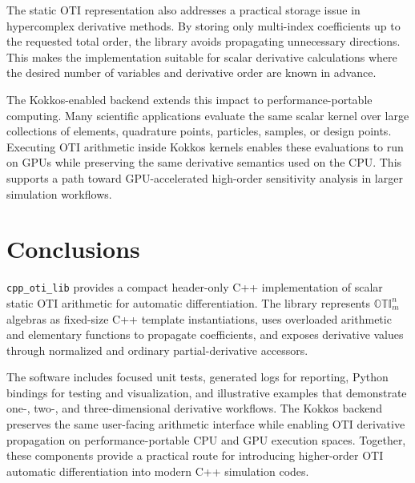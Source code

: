 \documentclass[11pt]{article}
\begin{document}
The static OTI representation also addresses a practical storage issue in
hypercomplex derivative methods. By storing only multi-index coefficients up
to the requested total order, the library avoids propagating unnecessary
directions. This makes the implementation suitable for scalar derivative
calculations where the desired number of variables and derivative order are
known in advance.

The Kokkos-enabled backend extends this impact to performance-portable
computing. Many scientific applications evaluate the same scalar kernel over
large collections of elements, quadrature points, particles, samples, or
design points. Executing OTI arithmetic inside Kokkos kernels enables these
evaluations to run on GPUs while preserving the same derivative semantics used
on the CPU. This supports a path toward GPU-accelerated high-order
sensitivity analysis in larger simulation workflows.

\section{Conclusions}

\texttt{cpp\_oti\_lib} provides a compact header-only C++ implementation of
scalar static OTI arithmetic for automatic differentiation. The library
represents \(\mathbb{OTI}_m^n\) algebras as fixed-size C++ template
instantiations, uses overloaded arithmetic and elementary functions to
propagate coefficients, and exposes derivative values through normalized and
ordinary partial-derivative accessors.

The software includes focused unit tests, generated logs for reporting,
Python bindings for testing and visualization, and illustrative examples that
demonstrate one-, two-, and three-dimensional derivative workflows. The Kokkos
backend preserves the same user-facing arithmetic interface while enabling
OTI derivative propagation on performance-portable CPU and GPU execution
spaces. Together, these components provide a practical route for introducing
higher-order OTI automatic differentiation into modern C++ simulation codes.



\end{document}
